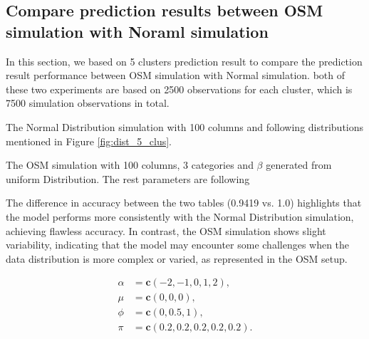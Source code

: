 \documentclass{article}
\begin{document}

\clearpage

\subsection{Compare prediction results between OSM simulation with Noraml simulation}

In this section, we based on 5 clusters prediction result to compare the prediction result performance between OSM simulation with Normal simulation.
both of these two experiments are based on 2500 observations for each cluster, which is 7500 simulation observations in total. 

The Normal Distribution simulation with 100 columns and following distributions mentioned in Figure \ref{fig:dist_5_clus}.

The OSM simulation with 100 columns, 3 categories and $\beta$ generated from uniform Distribution. The rest parameters are following

The difference in accuracy between the two tables (0.9419 vs. 1.0) highlights that the model performs more consistently with the Normal Distribution simulation, achieving flawless accuracy. 
In contrast, the OSM simulation shows slight variability, indicating that the model may encounter some challenges when the data distribution is more complex or varied, as represented in the OSM setup.

\[
\begin{aligned}
\alpha &= \mathbf{c}(-2, -1, 0, 1, 2), \\
\mu &= \mathbf{c}(0, 0, 0), \\
\phi &= \mathbf{c}(0, 0.5, 1), \\
\pi &= \mathbf{c}(0.2, 0.2, 0.2, 0.2, 0.2).
\end{aligned}
\]
\end{document}
